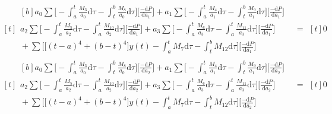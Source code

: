\documentclass[letterpaper%
, twoside%
, 12pt%
,memoire%
, english%
,creativecommons,hyperref%
]{thETS}
\begin{document}
\begin{equation}\label{eqn.115}
\begin{aligned}[t]
	\begin{aligned}[b]
	a_{0} \sum \bigg[-\int_{a}^{t}\frac{M_{3}}{a_{0}}\mathrm{d}\tau-\int_{t}^{b}\frac{M_{8}}{a_{0}}\mathrm{d}\tau\bigg] \bigg[\frac{-\mathrm{d}P}{\mathrm{d}a_{1}}\bigg] + a_{1} \sum \bigg[-\int_{a}^{t}\frac{M_{4}}{a_{1}}\mathrm{d}\tau-\int_{t}^{b}\frac{M_{9}}{a_{1}}\mathrm{d}\tau\bigg] \bigg[\frac{-\mathrm{d}P}{\mathrm{d}a_{1}}\bigg] \\
	a_{2} \sum \bigg[-\int_{a}^{t}\frac{M_{5}}{a_{2}}\mathrm{d}\tau-\int_{a}^{t}\frac{M_{10}}{a_{2}}\mathrm{d}\tau\bigg] \bigg[\frac{-\mathrm{d}P}{\mathrm{d}a_{1}}\bigg] + a_{3} \sum \bigg[-\int_{a}^{t}\frac{M_{6}}{a_{3}}\mathrm{d}\tau-\int_{a}^{t}\frac{M_{11}}{a_{3}}\mathrm{d}\tau\bigg] \bigg[\frac{-\mathrm{d}P}{\mathrm{d}a_{1}}\bigg] \\ 
	{} +\sum\bigg[\big[(t-a)^4+(b-t)^4\big]y(t) -\int_{a}^{t}{M_{7}}\mathrm{d}\tau-\int_{t}^{b}{M_{12}}\mathrm{d}\tau \bigg]\bigg[\frac{-\mathrm{d}P}{\mathrm{d}a_{1}}\bigg]
	\end{aligned}
	& =
	\begin{aligned}[t]
	0
	\end{aligned}
\end{aligned}
\end{equation}
\begin{equation}\label{eqn.116}
\begin{aligned}[t]
	\begin{aligned}[b]
	a_{0} \sum \bigg[-\int_{a}^{t}\frac{M_{3}}{a_{0}}\mathrm{d}\tau-\int_{t}^{b}\frac{M_{8}}{a_{0}}\mathrm{d}\tau\bigg] \bigg[\frac{-\mathrm{d}P}{\mathrm{d}a_{2}}\bigg] + a_{1} \sum \bigg[-\int_{a}^{t}\frac{M_{4}}{a_{1}}\mathrm{d}\tau-\int_{t}^{b}\frac{M_{9}}{a_{1}}\mathrm{d}\tau\bigg] \bigg[\frac{-\mathrm{d}P}{\mathrm{d}a_{2}}\bigg] \\
	a_{2} \sum \bigg[-\int_{a}^{t}\frac{M_{5}}{a_{2}}\mathrm{d}\tau-\int_{a}^{t}\frac{M_{10}}{a_{2}}\mathrm{d}\tau\bigg] \bigg[\frac{-\mathrm{d}P}{\mathrm{d}a_{2}}\bigg] + a_{3} \sum \bigg[-\int_{a}^{t}\frac{M_{6}}{a_{3}}\mathrm{d}\tau-\int_{a}^{t}\frac{M_{11}}{a_{3}}\mathrm{d}\tau\bigg] \bigg[\frac{-\mathrm{d}P}{\mathrm{d}a_{2}}\bigg] \\ 
	{} +\sum\bigg[\big[(t-a)^4+(b-t)^4\big]y(t) -\int_{a}^{t}{M_{7}}\mathrm{d}\tau-\int_{t}^{b}{M_{12}}\mathrm{d}\tau \bigg]\bigg[\frac{-\mathrm{d}P}{\mathrm{d}a_{2}}\bigg]
	\end{aligned}
	& =
	\begin{aligned}[t]
	0
	\end{aligned}
\end{aligned}
\end{equation}
\end{document}
